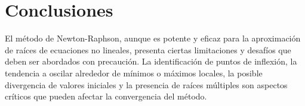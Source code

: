 \documentclass[conference]{IEEEtran}
\begin{document}
\section{Conclusiones}

El método de Newton-Raphson, aunque es potente y eficaz para 
la aproximación de raíces de ecuaciones no lineales, presenta ciertas 
limitaciones y desafíos que deben ser abordados con precaución. La 
identificación de puntos de inflexión, la tendencia a oscilar alrededor 
de mínimos o máximos locales, la posible divergencia de valores iniciales 
y la presencia de raíces múltiples son aspectos críticos que pueden afectar 
la convergencia del método.


\end{document}
